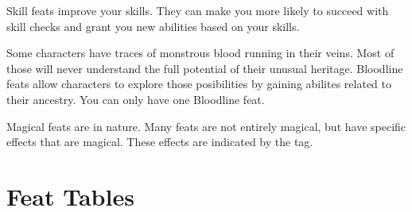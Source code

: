      Skill feats improve your skills.
    They can make you more likely to succeed with skill checks and grant you new abilities based on your skills.

     Some characters have traces of monstrous blood running in their veins.
    Most of those will never understand the full potential of their unusual heritage.
    Bloodline feats allow characters to explore those posibilities by gaining abilites related to their ancestry.
    You can only have one Bloodline feat.

    Magical feats are  in nature.
    Many feats are not entirely magical, but have specific effects that are magical.
    These effects are indicated by the \magical tag.

\section{Feat Tables}
    \newpage\onecolumn

